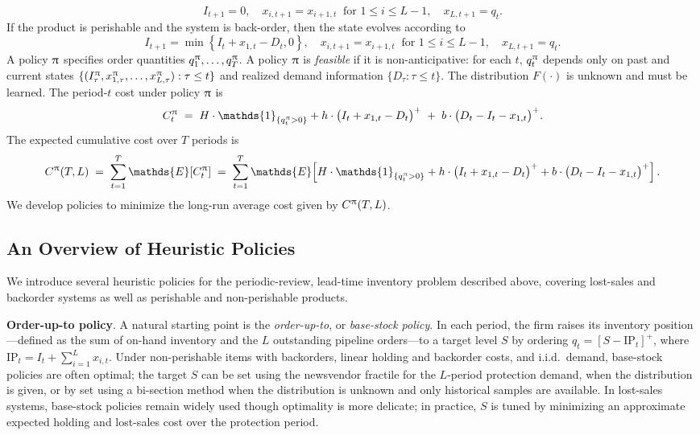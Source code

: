 \[
I_{t+1} = 0, 
\quad x_{i,t+1} = x_{i+1,t} \ \text{ for } 1 \le i \le L-1, 
\quad x_{L,t+1} = q_t.
\]
If the product is perishable and the system is back-order, then the state evolves according to
\[
I_{t+1} = \min\left\{ I_t + x_{1,t} - D_t, 0  \right\}, 
\quad x_{i,t+1} = x_{i+1,t} \ \text{ for } 1 \le i \le L-1, 
\quad x_{L,t+1} = q_t.
\]
A policy $\uppi$ specifies order quantities $q_1^{\uppi}, \ldots, q_T^{\uppi}$. A policy $\uppi$ is \emph{feasible} if it is non-anticipative: for each $t$, $q_t^{\uppi}$ depends only on past and current states $\{(I_\tau^{\uppi}, x_{1,\tau}^{\uppi}, \ldots, x_{L,\tau}^{\uppi}): \tau \le t\}$ and realized demand information $\{D_{\tau}: \tau \le t\}$. The distribution $F(\cdot)$ is unknown and must be learned.
The period-$t$ cost under policy $\uppi$ is
\[
C_t^\policy \;=\; H\cdot \mathds{1}_{\{q^\policy_t>0\}} + h \cdot \big(I_t + x_{1,t} - D_t\big)^+ \;+\; b \cdot \big(D_t - I_t - x_{1,t}\big)^+.
\]
The expected cumulative cost over $T$ periods is
\[
C^\policy(T, L) \;=\; \sum_{t=1}^T \mathds{E}[C_t^\policy]
\;=\; \sum_{t=1}^T \mathds{E}\!\left[H\cdot \mathds{1}_{\{q^\policy_t>0\}} + h \cdot \big(I_t + x_{1,t} - D_t\big)^+ + b \cdot \big(D_t - I_t - x_{1,t}\big)^+\right].
\]
We develop policies to minimize the long-run average cost given by $C^{\uppi}(T, L)$.

\subsection{An Overview of Heuristic Policies}
We introduce several heuristic policies for the periodic-review, lead-time inventory problem described above, covering lost-sales and backorder systems as well as perishable and non-perishable products. 

\noindent\textbf{Order-up-to policy}.
A natural starting point is the \textit{order-up-to}, or \textit{base-stock policy}. In each period, the firm raises its inventory position---defined as the sum of on-hand inventory and the $L$ outstanding pipeline orders---to a target level $S$ by ordering $q_t = [S - \mathrm{IP}_t]^+$, where $\mathrm{IP}_t = I_t + \sum_{i=1}^L x_{i,t}$. Under non-perishable items with backorders, linear holding and backorder costs, and i.i.d.\ demand, base-stock policies are often optimal; the target $S$ can be set using the newsvendor fractile for the $L$-period protection demand, when the distribution is given, or by set using a bi-section method when the distribution is unknown and only historical samples are available. In lost-sales systems, base-stock policies remain widely used though optimality is more delicate; in practice, $S$ is tuned by minimizing an approximate expected holding and lost-sales cost over the protection period.

